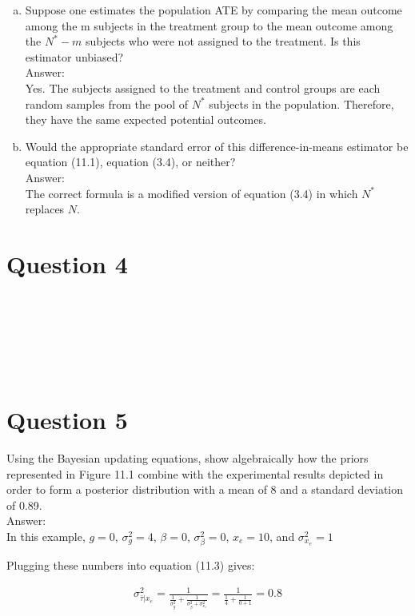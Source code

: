 \documentclass[11pt,notitlepage]{article}\usepackage[]{graphicx}\usepackage[]{color}
\makeatletter
\newenvironment{kframe}{%
 \def\at@end@of@kframe{}%
 \ifinner\ifhmode%
  \def\at@end@of@kframe{\end{minipage}}%
  \begin{minipage}{\columnwidth}%
 \fi\fi%
 \def\FrameCommand##1{\hskip\@totalleftmargin \hskip-\fboxsep
 \colorbox{shadecolor}{##1}\hskip-\fboxsep
     \hskip-\linewidth \hskip-\@totalleftmargin \hskip\columnwidth}%
 \MakeFramed {\advance\hsize-\width
   \@totalleftmargin\z@ \linewidth\hsize
   \@setminipage}}%
 {\par\unskip\endMakeFramed%
 \at@end@of@kframe}
\newenvironment{knitrout}{}{} %
\makeatother
\begin{document}
\begin{enumerate}[a)]
\item Suppose one estimates the population ATE by comparing the mean outcome among the m subjects in the treatment group to the mean outcome among the $N^* - m$ subjects who were not assigned to the treatment. Is this estimator unbiased?\\
Answer:\\
Yes. The subjects assigned to the treatment and control groups are each random samples from the pool of $N^*$ subjects in the population.  Therefore, they have the same expected potential outcomes.
\item Would the appropriate standard error of this difference-in-means estimator be equation (11.1), equation (3.4), or neither?\\
Answer:\\
The correct formula is a modified version of equation (3.4) in which $N^*$ replaces $N$.
\end{enumerate}


\section*{Question 4}
\begin{knitrout}
\color{fgcolor}\begin{kframe}
\begin{verbatim}






\end{verbatim}
\end{kframe}
\end{knitrout}


\section*{Question 5}
Using the Bayesian updating equations, show algebraically how the priors represented in Figure 11.1 combine with the experimental results depicted in order to form a posterior distribution with a mean of 8 and a standard deviation of 0.89.\\
Answer:\\
In this example, $g=0$, $\sigma^2_g = 4$, $\beta = 0$, $\sigma^2_{\beta} = 0$, $x_e = 10$, and $\sigma^2_{x_e} = 1$

Plugging these numbers into equation (11.3) gives: 

 \begin{align*}
\sigma^2_{\bar{\tau}|x_e} = \frac{1}{\frac{1}{\sigma^2_g} + \frac{1}{\sigma^2_{\beta} + \sigma^2_{x_e}}} = \frac{1}{\frac{1}{4} + \frac{1}{0+1}} = 0.8
\end{align*}
 
\end{document}

